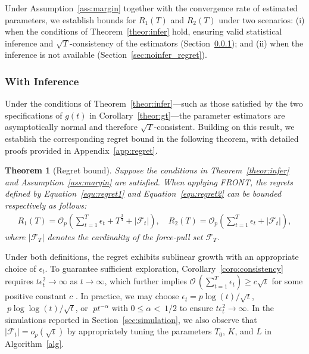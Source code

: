 \documentclass[12pt]{article}
\newtheorem{theorem}{Theorem}
\begin{document}
Under Assumption~\ref{ass:margin} together with the convergence rate of estimated parameters, we establish bounds for $R_1(T)$ and $R_2(T)$ under two scenarios:  
(i) when the conditions of Theorem~\ref{theor:infer} hold, ensuring valid statistical inference and $\sqrt{T}$-consistency of the estimators (Section~\ref{sec:infer_regret}); and
(ii) when the inference is not available (Section~\ref{sec:noinfer_regret}).


\subsubsection{With Inference}
\label{sec:infer_regret}
Under the conditions of Theorem~\ref{theor:infer}—such as those satisfied by the two specifications of $g(t)$ in Corollary~\ref{theor:gt}—the parameter estimators are asymptotically normal and therefore $\sqrt{T}$-consistent. Building on this result, we establish the corresponding regret bound in the following theorem, with detailed proofs provided in Appendix~\ref{app:regret}.


\begin{theorem}[Regret bound]
\label{theor:regret}
Suppose the conditions in Theorem~\ref{theor:infer} and Assumption~\ref{ass:margin} are satisfied. When applying FRONT, the regrets defined by Equation~\eqref{equ:regret1} and Equation~\eqref{equ:regret2} can be bounded respectively as follows:
\begin{align*}
    R_1(T)  = \mathcal{O}_p \left(\sum_{t=1}^T \epsilon_t + T^{\frac{3}{4}}+|\mathcal{F}_t| \right), \quad 
    R_2(T)  = \mathcal{O}_p \left(\sum_{t=1}^T \epsilon_t + |\mathcal{F}_t| \right),
\end{align*}
where $|\mathcal{F}_T|$ denotes the cardinality of the force-pull set $\mathcal{F}_T$.
\end{theorem}

Under both definitions, the regret exhibits sublinear growth with an appropriate choice of $\epsilon_t$. To guarantee sufficient exploration, Corollary~\ref{coro:consistency} requires $t\epsilon_t^2 \to \infty$ as $t \to \infty$, which further implies $\mathcal{O}\,(\sum_{t=1}^T \epsilon_t ) \ge c \sqrt{t}$ for some positive constant $c$ \citep{chen2021}. In practice, we may choose $\epsilon_t = p \log(t)/\sqrt{t}$, $\;p \log \log(t)/\sqrt{t}$, or $\;p t^{-\alpha}$ with $0\le\alpha<\ 1/2$ to ensure $t\epsilon_t^2 \to \infty$.  
In the simulations reported in Section~\ref{sec:simulation}, we also observe that $|\mathcal{F}_t| = o_p(\sqrt{t})$ by appropriately tuning the parameters $T_0$, $K$, and $L$ in Algorithm~\ref{alg}.
\end{document}
